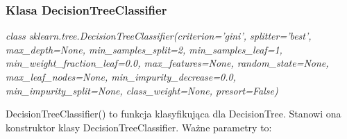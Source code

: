 \documentclass[10pt,a4paper]{article}
\begin{document}
\subsubsection{Klasa DecisionTreeClassifier}
\begin{flushleft}
	\textit{class sklearn.tree.DecisionTreeClassifier(criterion=’gini’, splitter=’best’, max\_depth=None, min\_samples\_split=2, min\_samples\_leaf=1, min\_weight\_fraction\_leaf=0.0, max\_features=None, random\_state=None, max\_leaf\_nodes=None, min\_impurity\_decrease=0.0, min\_impurity\_split=None, class\_weight=None, presort=False)}
\end{flushleft}\par
\vskip 0.2in

DecisionTreeClassifier() to funkcja klasyfikująca dla DecisionTree. Stanowi ona konstruktor klasy DecisionTreeClassifier. Ważne parametry to:
\end{document}
